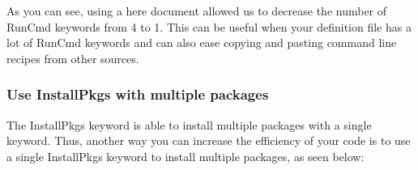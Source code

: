 \documentclass[letterpaper,10pt,english]{sphinxmanual}
\begin{document}
%
\begin{sphinxVerbatim}[commandchars=\\\{\}]
 

 

 





 

 

  

 

 

   

   



\end{sphinxVerbatim}

As you can see, using a here document allowed us to decrease the number of RunCmd keywords from 4 to 1. This can be useful when your definition file
has a lot of RunCmd keywords and can also ease copying and pasting command line recipes from other sources.


\subsubsection{Use InstallPkgs with multiple packages}
\label{\detokenize{appendix:use-installpkgs-with-multiple-packages}}
The InstallPkgs keyword is able to install multiple packages with a single keyword. Thus, another way you can increase the efficiency of your code is to
use a single InstallPkgs keyword to install multiple packages, as seen below:
\end{document}
